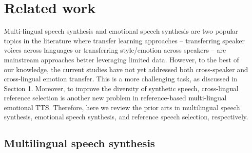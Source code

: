\documentclass[journal,comsoc]{IEEEtran}
\begin{document}
\section{Related work}
\label{sc:related work}
Multi-lingual speech synthesis and emotional speech synthesis are two popular topics in the literature where transfer learning approaches -- transferring speaker voices across languages or transferring style/emotion across speakers -- are mainstream approaches better leveraging limited data. However, to the best of our knowledge, the current studies have not yet addressed both cross-speaker and cross-lingual emotion transfer. This is a more challenging task, as discussed in Section 1. Moreover, to improve the diversity of synthetic speech, cross-lingual reference selection is another new problem in reference-based multi-lingual emotional TTS. Therefore, here we review the prior arts in multilingual speech synthesis, emotional speech synthesis, and reference speech selection, respectively.

\subsection{Multilingual speech synthesis}


\end{document}
